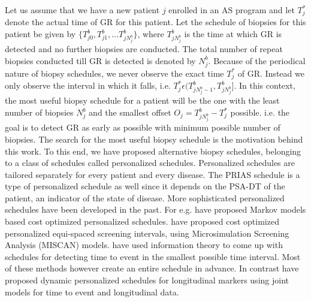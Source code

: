 Let us assume that we have a new patient $j$ enrolled in an AS program and let $T_j^*$ denote the actual time of GR for this patient. Let the schedule of biopsies for this patient be given by $\{T^b_{j0}, T^b_{j1}, \ldots T^b_{j{N_j^b}}\}$, where $T^b_{j{N_j^b}}$ is the time at which GR is detected and no further biopsies are conducted. The total number of repeat biopsies conducted till GR is detected is denoted by $N_j^b$. Because of the periodical nature of biopsy schedules, we never observe the exact time $T_j^*$ of GR. Instead we only observe the interval in which it falls, i.e. $T^*_j \epsilon (T^b_{j{N_j^b - 1}}, T^b_{j{N_j^b}}]$. In this context, the most useful biopsy schedule for a patient will be the one with the least number of biopsies $N_j^b$ and the smallest offset $O_j = T^b_{j{N_j^b}} - T_j^*$ possible. i.e. the goal is to detect GR as early as possible with minimum possible number of biopsies. The search for the most useful biopsy schedule is the motivation behind this work. To this end, we have proposed alternative biopsy schedules, belonging to a class of schedules called personalized schedules. Personalized schedules are tailored separately for every patient and every disease. The PRIAS schedule is a type of personalized schedule as well since it depends on the PSA-DT of the patient, an indicator of the state of disease. More sophisticated personalized schedules have been developed in the past. For e.g. \cite{bebu2017OptimalScreening} have proposed Markov models based cost optimized personalized schedules. \cite{oMahonyOptimaInterval} have proposed cost optimized personalized equi-spaced screening intervals, using Microsimulation Screening Analysis (MISCAN) models. \cite{parmigiani1998designing} have used information theory to come up with schedules for detecting time to event in the smallest possible time interval. Most of these methods however create an entire schedule in advance. In contrast \cite{drizopoulosPersScreening} have proposed dynamic personalized schedules for longitudinal markers using joint models for time to event and longitudinal data\citep{tsiatis2004joint,rizopoulos2012joint}.\\

